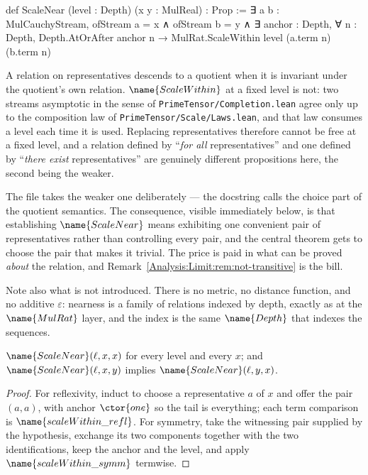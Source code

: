 \begin{leancode}
def ScaleNear (level : Depth) (x y : MulReal) : Prop :=
  ∃ a b : MulCauchyStream,
    ofStream a = x ∧
    ofStream b = y ∧
    ∃ anchor : Depth,
      ∀ n : Depth,
        Depth.AtOrAfter anchor n →
        MulRat.ScaleWithin level (a.term n) (b.term n)
\end{leancode}

\begin{designnote}
\label{Analysis:Limit:note:existential}
A relation on representatives descends to a quotient when it is invariant
under the quotient's own relation.  $\name{ScaleWithin}$ at a fixed level is
not: two streams asymptotic in the sense of
\texttt{PrimeTensor/Completion.lean} agree only up to the composition law of
\texttt{PrimeTensor/Scale/Laws.lean}, and that law consumes a level each time
it is used.  Replacing representatives therefore cannot be free at a fixed
level, and a relation defined by ``\emph{for all} representatives'' and one
defined by ``\emph{there exist} representatives'' are genuinely different
propositions here, the second being the weaker.

The file takes the weaker one deliberately --- the docstring calls the choice
part of the quotient semantics.  The consequence, visible immediately below, is
that establishing $\name{ScaleNear}$ means exhibiting one convenient pair of
representatives rather than controlling every pair, and the central theorem
gets to choose the pair that makes it trivial.  The price is paid in what can
be proved \emph{about} the relation, and
Remark~\ref{Analysis:Limit:rem:not-transitive} is the bill.

Note also what is not introduced.  There is no metric, no distance function,
and no additive $\varepsilon$: nearness is a family of relations indexed by
depth, exactly as at the $\name{MulRat}$ layer, and the index is the same
$\name{Depth}$ that indexes the sequences.
\end{designnote}

\begin{lemma}
\label{Analysis:Limit:lem:refl-symm}
$\name{ScaleNear}(\ell, x, x)$ for every level and every $x$; and
$\name{ScaleNear}(\ell,x,y)$ implies $\name{ScaleNear}(\ell,y,x)$.
\end{lemma}

\begin{proof}
For reflexivity, induct to choose a representative $a$ of $x$ and offer the
pair $(a,a)$, with anchor $\ctor{one}$ so the tail is everything; each term
comparison is $\name{scaleWithin\_refl}$.  For symmetry, take the witnessing
pair supplied by the hypothesis, exchange its two components together with the
two identifications, keep the anchor and the level, and apply
$\name{scaleWithin\_symm}$ termwise.
\end{proof}

